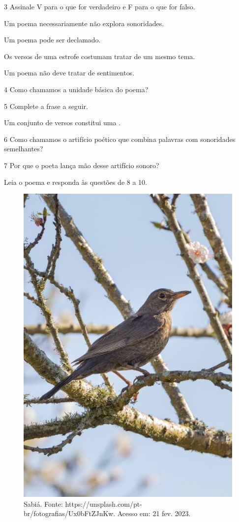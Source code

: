 \num{3} Assinale V para o que for verdadeiro e F para o que for falso.

\begin{boxlist}
\item Um poema necessariamente não explora sonoridades. 

\item Um poema pode ser declamado. 

\item Os versos de uma estrofe costumam tratar de um mesmo tema. 

\item Um poema não deve tratar de sentimentos. 
\end{boxlist}

\num{4} Como chamamos a unidade básica do poema?


\num{5} Complete a frase a seguir.

Um conjunto de versos constitui uma \preencher. 

\num{6} Como chamamos o artifício poético que combina palavras com
sonoridades semelhantes?



\num{7} Por que o poeta lança mão desse artifício sonoro?



Leia o poema e responda às questões de 8 a 10.

\begin{figure}[htpb!]
\includegraphics[width=.5\textwidth]{./imgs/img17.jpg}
\caption{Sabiá. Fonte: https://unsplash.com/pt-br/fotografias/Ux0bFtZJnKw. Acesso em: 21 fev. 2023.}
\end{figure}

